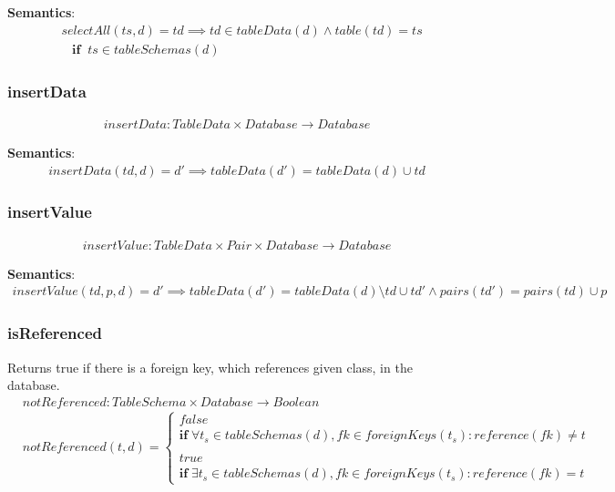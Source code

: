 \documentclass[10pt]{article}
\begin{document}
\textbf{Semantics}:
\begin{align}
& selectAll(ts, d) = td \implies td \in tableData(d) \land table(td) = ts \nonumber \\
& \;\;\; \mathbf{if}  \;\; ts \in tableSchemas(d)
\end{align}

\subsubsection{insertData}
\begin{align}
insertData: TableData \times Database \rightarrow Database
\end{align}

\textbf{Semantics}:
\begin{align}
insertData(td, d) = d' \implies tableData(d') = tableData(d) \cup td 
\end{align}

\subsubsection{insertValue}
\begin{align}
insertValue: TableData \times Pair \times  Database \rightarrow Database
\end{align}

\textbf{Semantics}:
\begin{align}
insertValue(td, p, d) = d' \implies tableData(d') = tableData(d) \setminus td \cup td' \land pairs(td') = pairs(td) \cup p 
\end{align}


\subsubsection{isReferenced}
Returns true if there is a foreign key, which references given class, in the database.
\begin{align}
& notReferenced: TableSchema \times Database \rightarrow Boolean \\
& notReferenced(t, d) = \begin{cases}
 false \\
 \mathbf{if} \; \forall t_s \in tableSchemas(d), fk \in foreignKeys(t_s) : reference(fk) \neq t \\\\
 true \\
 \mathbf{if} \;  \exists t_s \in tableSchemas(d), fk \in foreignKeys(t_s) : reference(fk) = t
 \end{cases}
\end{align}
\end{document}
